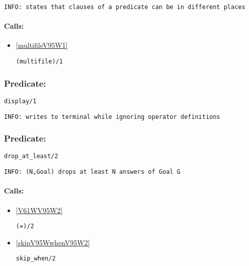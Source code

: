 {\small \begin{verbatim}
INFO: states that clauses of a predicate can be in different places

\end{verbatim}}
\paragraph{Calls:} 
\begin{itemize}
\item \ref{multifileV95W1} 
\begin{verbatim}
(multifile)/1
\end{verbatim}

\end{itemize}

\subsubsection{Predicate:} \label{displayV95W1}

\begin{verbatim}
display/1
\end{verbatim}

{\small \begin{verbatim}
INFO: writes to terminal while ignoring operator definitions

\end{verbatim}}

\subsubsection{Predicate:} \label{dropV95WatV95WleastV95W2}

\begin{verbatim}
drop_at_least/2
\end{verbatim}

{\small \begin{verbatim}
INFO: (N,Goal) drops at least N answers of Goal G

\end{verbatim}}
\paragraph{Calls:} 
\begin{itemize}
\item \ref{V61WV95W2} 
\begin{verbatim}
(=)/2
\end{verbatim}

\item \ref{skipV95WwhenV95W2} 
\begin{verbatim}
skip_when/2
\end{verbatim}

\end{itemize}

